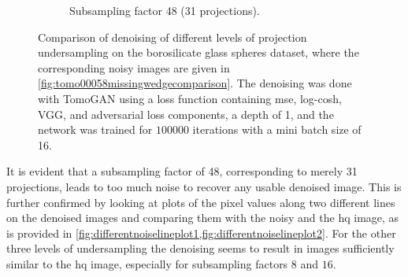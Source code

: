 \begin{figure}
\begin{subfigure}[t]{.45\textwidth}
    \caption{Subsampling factor 48 (31 projections). }
  \end{subfigure}
  \caption[Denoising of four different levels of projection undersampling]{Comparison of denoising of different levels of projection undersampling on the borosilicate glass spheres dataset, where the corresponding noisy images are given in \cref{fig:tomo00058missingwedgecomparison}. The denoising was done with TomoGAN using a loss function containing \gls{mse}, log-cosh, VGG, and adversarial loss components, a depth of 1, and the network was trained for $100 000$ iterations with a mini batch size of 16. }
  \label{fig:tomo00058missingwedgecomparisondenoised}
\end{figure}

It is evident that a subsampling factor of 48, corresponding to merely 31 projections, leads to too much noise to recover any usable denoised image. This is further confirmed by looking at plots of the pixel values along two different lines on the denoised images and comparing them with the noisy and the \gls{hq} image, as is provided in \cref{fig:differentnoiselineplot1,fig:differentnoiselineplot2}. For the other three levels of undersampling the denoising seems to result in images sufficiently similar to the \gls{hq} image, especially for subsampling factors $8$ and $16$. 


